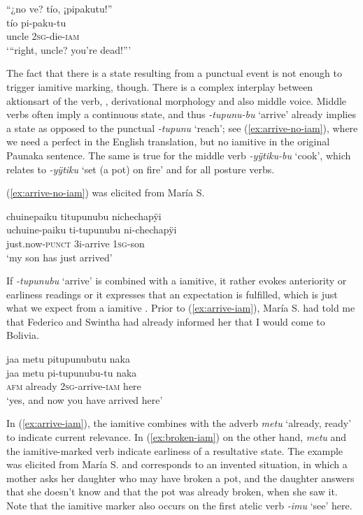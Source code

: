 \ea\label{ex:die-iam}
\begingl
\glpreamble “¿no ve? tío, ¡pipakutu!”\\
 tío pi-paku-tu\\
 uncle 2\textsc{sg}-die-\textsc{iam}\\
\glft ‘“right, uncle? you’re dead!”’
\endgl
\trailingcitation{[jmx-n120429ls-x5.286-287]}
\xe

The fact that there is a state resulting from a punctual event is not enough to trigger iamitive marking, though. There is a complex interplay between aktionsart of the verb, , derivational morphology and also middle voice. Middle verbs often imply a continuous state, and thus \textit{-tupunu-bu} ‘arrive’ already implies a  state as opposed to the punctual \textit{-tupunu} ‘reach’; see (\ref{ex:arrive-no-iam}), where we need a perfect in the English translation, but no iamitive in the original Paunaka sentence. The same is true for the middle verb \textit{-yÿtiku-bu} ‘cook’, which relates to \textit{-yÿtiku} ‘set (a pot) on fire’ and for all posture verbs.

(\ref{ex:arrive-no-iam}) was elicited from María S.

\ea\label{ex:arrive-no-iam}
\begingl
\glpreamble chuinepaiku titupunubu nichechapÿi\\
\gla uchuine-paiku ti-tupunubu ni-chechapÿi\\
\glb just.now-\textsc{punct} 3i-arrive 1\textsc{sg}-son \\
\glft ‘my son has just arrived’
\endgl
\trailingcitation{[rxx-e181022le.124]}
\xe
{}

If \textit{-tupunubu} ‘arrive’ is combined with a iamitive, it rather evokes anteriority or earliness readings or it expresses that an expectation is fulfilled, which is just what we expect from a iamitive \citep[cf.][21]{Olsson2013}. Prior to (\ref{ex:arrive-iam}), María S. had told me that Federico and Swintha had already informed her that I would come to Bolivia.

\ea\label{ex:arrive-iam}
\begingl
\glpreamble jaa metu pitupunubutu naka\\
\gla jaa metu pi-tupunubu-tu naka\\
\glb \textsc{afm} already 2\textsc{sg}-arrive-\textsc{iam} here\\
\glft ‘yes, and now you have arrived here’
\endgl
\trailingcitation{[rxx-e181017l.005]}
\xe

In (\ref{ex:arrive-iam}), the iamitive combines with the adverb \textit{metu} ‘already, ready’ to indicate current relevance. In (\ref{ex:broken-iam}) on the other hand, \textit{metu} and the iamitive-marked verb indicate earliness of a resultative state. The example was elicited from María S. and corresponds to an invented situation, in which a mother asks her daughter who may have broken a pot, and the daughter answers that she doesn’t know and that the pot was already broken, when she saw it. Note that the iamitive marker also occurs on the first atelic verb \textit{-imu} ‘see’ here.

